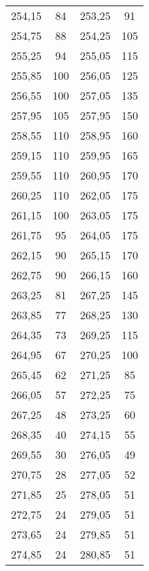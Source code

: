 \begin{longtable}{c c ||c c}
254,15 &       84   &          253,25 &       91   \\
254,75 &       88   &          254,25 &      105   \\
255,25 &       94   &          255,05 &      115   \\
255,85 &      100   &          256,05 &      125   \\
256,55 &      100   &          257,05 &      135   \\
257,95 &      105   &          257,95 &      150   \\
258,55 &      110   &          258,95 &      160   \\
259,15 &      110   &          259,95 &      165   \\
259,55 &      110   &          260,95 &      170   \\
260,25 &      110   &          262,05 &      175   \\
261,15 &      100   &          263,05 &      175   \\
261,75 &       95   &          264,05 &      175   \\
262,15 &       90   &          265,15 &      170   \\
262,75 &       90   &          266,15 &      160   \\
263,25 &       81   &          267,25 &      145   \\
263,85 &       77   &          268,25 &      130   \\
264,35 &       73   &          269,25 &      115   \\
264,95 &       67   &          270,25 &      100   \\
265,45 &       62   &          271,25 &       85   \\
266,05 &       57   &          272,25 &       75   \\
267,25 &       48   &          273,25 &       60   \\
268,35 &       40   &          274,15 &       55   \\
269,55 &       30   &          276,05 &       49   \\
270,75 &       28   &          277,05 &       52   \\
271,85 &       25   &          278,05 &       51   \\
272,75 &       24   &          279,05 &       51   \\
273,65 &       24   &          279,85 &       51   \\
274,85 &       24   &          280,85 &       51   \\

\end{longtable}
